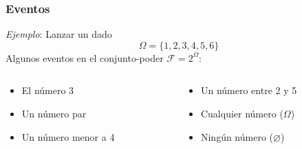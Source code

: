 \documentclass[xcolor=dvipsnames,10pt]{beamer}
\begin{document}
\begin{frame}
  \frametitle{Eventos}
  \emph{Ejemplo}: Lanzar un dado
  \begin{equation*}
    \Omega = \{1, 2, 3, 4, 5, 6 \}
  \end{equation*}
  Algunos eventos en el conjunto-poder $\mathcal{F} = 2^{\Omega}$:
  \begin{columns}
    \begin{column}{0.48\textwidth}
      \begin{itemize}
      \item El número 3
      \item Un número par
      \item Un número menor a 4
      \end{itemize}
    \end{column}
    \begin{column}{0.48\textwidth}
      \begin{itemize}
      \item Un número entre 2 y 5
      \item Cualquier número ($\Omega$)
      \item Ningún número ($\varnothing$)
      \end{itemize}
    \end{column}
  \end{columns}
\end{frame}
%
\end{document}
